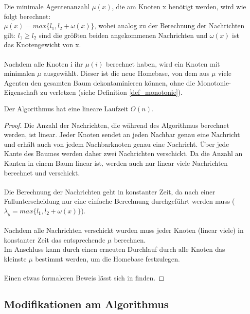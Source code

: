 Die minimale Agentenanzahl $\mu(x)$, die am Knoten x benötigt werden, wird wie folgt berechnet:
\\
$\mu(x) = max\{l_{1},  l_{2} + \omega(x)\}$, wobei analog zu der Berechnung der Nachrichten gilt: $l_{1} \ge l_{2}$ sind die größten beiden angekommenen Nachrichten und $\omega(x)$ ist das Knotengewicht von x.
\\
\\
Nachdem alle Knoten i ihr $\mu(i)$ berechnet haben, wird ein Knoten mit minimalen $\mu$ ausgewählt. Dieser ist die neue Homebase, von dem aus $\mu$ viele Agenten den gesamten Baum dekontaminieren können, ohne die Monotonie-Eigenschaft zu verletzen (siehe Definition \ref{def_monotonie}).


	\begin{theorem}\label{thm_laufzeit}
		Der Algorithmus hat eine lineare Laufzeit $O(n)$.
	\end{theorem}
	\begin{proof}
		Die Anzahl der Nachrichten, die während des Algorithmus berechnet werden, ist linear. Jeder Knoten sendet an jeden Nachbar genau eine Nachricht und erhält auch von jedem Nachbarknoten genau eine Nachricht. Über jede Kante des Baumes werden daher zwei Nachrichten verschickt. Da die Anzahl an Kanten in einem Baum linear ist, werden auch nur linear viele Nachrichten berechnet und verschickt.\\\\
		Die Berechnung der Nachrichten geht in konstanter Zeit, da nach einer Fallunterscheidung nur eine einfache Berechnung durchgeführt werden muss ($\lambda_{y} = max\{l_{1},  l_{2} + \omega(x)\}$).\\\\
		Nachdem alle Nachrichten verschickt wurden muss jeder Knoten (linear viele) in konstanter Zeit das entsprechende $\mu$ berechnen.\\
		Im Anschluss kann durch einen erneuten Durchlauf durch alle Knoten das kleinste $\mu$ bestimmt werden, um die Homebase festzulegen.
		\\
		\\
		Einen etwas formaleren Beweis lässt sich in \cite{cima_paper} finden.
	\end{proof}

\newpage

\subsection{Modifikationen am Algorithmus}\label{modifizierterAlgoChapter}


